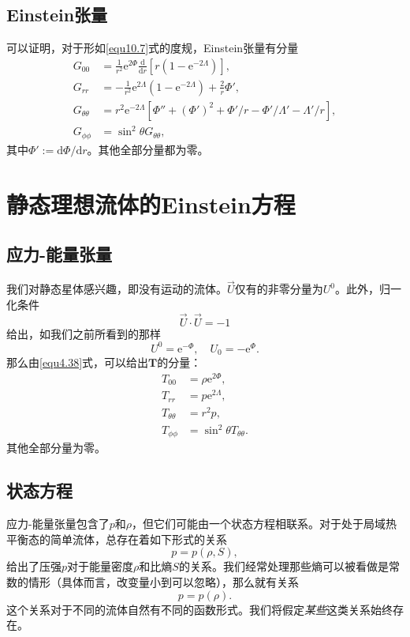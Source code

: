 \subsection*{Einstein张量}
可以证明，对于形如\eqref{equ10.7}式的度规，Einstein张量有分量
\begin{align}
G_{00}&=\frac{1}{r^2}\mathrm e^{2\Phi}\frac{\mathrm d}{\mathrm dr}[r(1-\mathrm e^{-2\Lambda})],\\
G_{rr}&=-\frac{1}{r^2}\mathrm e^{2\Lambda}(1-\mathrm e^{-2\Lambda})+\frac{2}{r}\Phi',\\
G_{\theta\theta}&=r^2\mathrm e^{-2\Lambda}[\Phi''+(\Phi')^2+\Phi'/r-\Phi'/\Lambda'-\Lambda'/r],\\
G_{\phi\phi}&=\sin^2\theta G_{\theta\theta},
\end{align}
其中$\Phi':=\mathrm d\Phi/\mathrm dr$。其他全部分量都为零。

\section{静态理想流体的Einstein方程}\label{sec10.2}
\subsection*{应力-能量张量}
我们对静态星体感兴趣，即没有运动的流体。$\vec{U}$仅有的非零分量为$U^0$。此外，归一化条件
\begin{equation}
\vec{U}\cdot\vec{U}=-1
\end{equation}
给出，如我们之前所看到的那样
\begin{equation}
U^0=\mathrm e^{-\Phi},\quad U_0=-\mathrm e^{\Phi}.
\end{equation}
那么由\eqref{equ4.38}式，可以给出$\mathbf T$的分量：
\begin{align}
T_{00}&=\rho\mathrm e^{2\Phi},\\
T_{rr}&=p\mathrm e^{2\Lambda},\\
T_{\theta\theta}&=r^2p,\\
T_{\phi\phi}&=\sin^2\theta T_{\theta\theta}.
\end{align}
其他全部分量为零。
\subsection*{状态方程}
应力-能量张量包含了$p$和$\rho$，但它们可能由一个状态方程相联系。对于处于局域热平衡态的简单流体，总存在着如下形式的关系
\begin{equation}
p=p(\rho,S),
\end{equation}
给出了压强$p$对于能量密度$\rho$和比熵$S$的关系。我们经常处理那些熵可以被看做是常数的情形（具体而言，改变量小到可以忽略），那么就有关系
\begin{equation}
p=p(\rho).
\end{equation}
这个关系对于不同的流体自然有不同的函数形式。我们将假定{\it 某些}这类关系始终存在。
